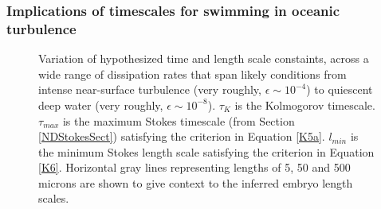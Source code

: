 \documentclass[10pt,a4paper]{article}
\def\l{\mathit{l}}
\begin{document}
\subsubsection{Implications of timescales for swimming in oceanic turbulence}\label{turb}
\begin{figure}[t] 
	\begin{center}
	\end{center}
	\caption{Variation of hypothesized time and length scale constaints, across a wide range of dissipation rates that span likely conditions from intense near-surface turbulence (very roughly, $\epsilon \sim 10^{-4}$) to quiescent deep water (very roughly, $\epsilon \sim 10^{-8}$). $\tau_K$ is the Kolmogorov timescale. $\tau_{max}$ is the maximum Stokes timescale (from Section \ref{NDStokesSect}) satisfying the criterion in Equation \ref{K5a}. $\l_{min}$ is the minimum Stokes length scale satisfying the criterion in Equation \ref{K6}. Horizontal gray lines representing lengths of 5, 50 and 500 microns are shown to give context to the inferred embryo length scales. 
	} \label{fig:Kol}
\end{figure}
\end{document}
